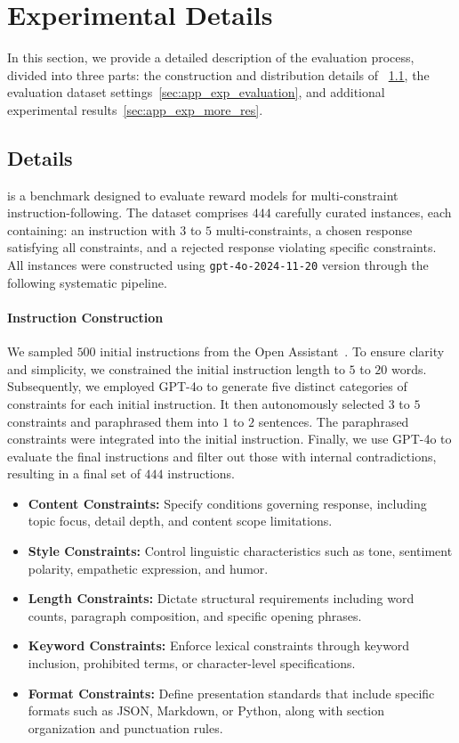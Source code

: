 \section{Experimental Details}
\label{sec:app_exp}
In this section, we provide a detailed description of the evaluation process, divided into three parts: the construction and distribution details of \ourdataset~\ref{sec:app_exp_ifbench}, the evaluation dataset settings~\ref{sec:app_exp_evaluation}, and additional experimental results~\ref{sec:app_exp_more_res}.

\subsection{\ourdataset Details}
\label{sec:app_exp_ifbench}

\ourdataset is a benchmark designed to evaluate reward models for multi-constraint instruction-following. The dataset comprises $444$ carefully curated instances, each containing: an instruction with $3$ to $5$ multi-constraints, a chosen response satisfying all constraints, and a rejected response violating specific constraints. All instances were constructed using \texttt{gpt-4o-2024-11-20} version through the following systematic pipeline.

\paragraph{Instruction Construction} We sampled $500$ initial instructions from the Open Assistant~\cite{kopf2023openassistant}. To ensure clarity and simplicity, we constrained the initial instruction length to $5$ to $20$ words. Subsequently, we employed GPT-4o to generate five distinct categories of constraints for each initial instruction. It then autonomously selected $3$ to $5$ constraints and paraphrased them into $1$ to $2$ sentences. The paraphrased constraints were integrated into the initial instruction. Finally, we use GPT-4o to evaluate the final instructions and filter out those with internal contradictions, resulting in a final set of $444$ instructions.

\begin{itemize}
    \item {\bf Content Constraints: } Specify conditions governing response, including topic focus, detail depth, and content scope limitations.
    \item {\bf Style Constraints: } Control linguistic characteristics such as tone, sentiment polarity, empathetic expression, and humor.
    \item {\bf Length Constraints: } Dictate structural requirements including word counts, paragraph composition, and specific opening phrases.
    \item {\bf Keyword Constraints: } Enforce lexical constraints through keyword inclusion, prohibited terms, or character-level specifications.
    \item {\bf Format Constraints: } Define presentation standards that include specific formats such as JSON, Markdown, or Python, along with section organization and punctuation rules.
\end{itemize}


